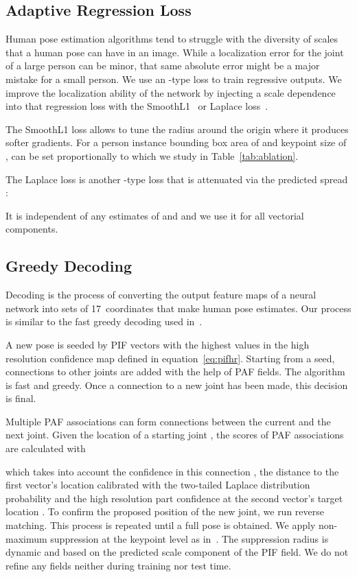 \documentclass[10pt,twocolumn,letterpaper]{article}
\begin{document}
\subsection{Adaptive Regression Loss}
\label{sec:adaptive-r}

Human pose estimation algorithms tend to struggle with the diversity of scales that
a human pose can have in an image. While a localization error for the joint of
a large person can be minor, that same absolute error might be a major mistake
for a small person. We use an -type loss to train regressive outputs.
We improve the localization ability of the network by injecting
a scale dependence into that regression loss with the
SmoothL1~\cite{girshick2015fast} or Laplace loss~\cite{kendall2017uncertainties}.






The SmoothL1 loss allows to tune the radius  around the
origin where it produces softer gradients.
For a person
instance bounding box area of  and keypoint size of ,
 can be set proportionally to 
which we study in Table~\ref{tab:ablation}.

The Laplace loss is another -type loss that is attenuated via the predicted
spread :

It is independent of any estimates of
 and  and we use it for all vectorial components.


\subsection{Greedy Decoding}

Decoding is the process of converting the output feature maps of a neural
network into sets of 17~coordinates that make human pose estimates.
Our process is similar to the
fast greedy decoding used in~\cite{personlab}.

A new pose is seeded by PIF vectors with the highest values in the
high resolution confidence map  defined in equation~\ref{eq:pifhr}.
Starting from a seed, connections to other joints are added with the help
of PAF fields. The algorithm is fast and greedy. Once a connection to a new
joint has been made, this decision is final.

Multiple PAF associations can form connections between the current and the
next joint.
Given the location of a starting
joint , the scores  of PAF associations  are calculated with

which takes into account the confidence in this connection , the distance to the first
vector's location calibrated with the two-tailed Laplace distribution probability and the high resolution
part confidence at the second vector's target location .
To confirm the proposed position of the new joint, we run reverse matching.
This process is repeated until a full pose is obtained.
We apply non-maximum suppression at the keypoint level as in~\cite{personlab}.
The suppression radius is dynamic and based on the predicted scale component of
the PIF field.
We do not refine any fields neither during training nor test time.
\end{document}
